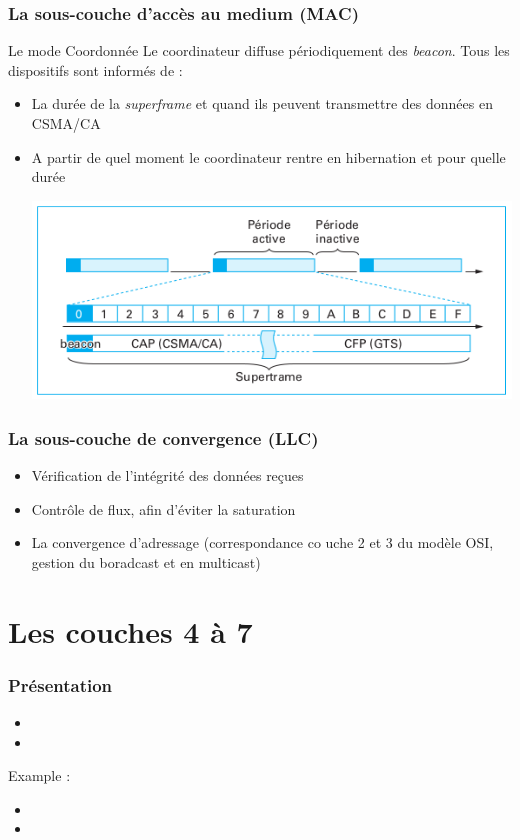 \documentclass{beamer}
\begin{document}
  \begin{frame}
    \frametitle{La sous-couche d'accès au medium (MAC)}
    \begin{block}{Le mode Coordonnée}
      Le coordinateur diffuse périodiquement des \textit{beacon}. Tous les dispositifs sont informés de :
      \begin{itemize}
        \item La durée de la \textit{superframe} et quand ils peuvent transmettre des données en CSMA/CA
        \item A partir de quel moment le coordinateur rentre en hibernation et pour quelle durée
	\begin{center}
	\includegraphics[scale=0.4]{Supertrame.png}
	\end{center} 
      \end{itemize}
    \end{block}
  \end{frame}

  \begin{frame}
    \frametitle{La sous-couche de convergence (LLC)}
    \begin{itemize}
      \item Vérification de l'intégrité des données reçues
      \item Contrôle de flux, afin d'éviter la saturation
      \item La convergence d'adressage (correspondance co uche 2 et 3 du modèle OSI, gestion du boradcast et en multicast)
    \end{itemize}
  \end{frame}

  \section{Les couches 4 à 7}
  \begin{frame}
    \frametitle{Présentation}
    \begin{itemize}
      \item 
      \item 
    \end{itemize}
    Example : 
    \begin{itemize}
      \item 
      \item 
    \end{itemize}
  \end{frame}
\end{document}
